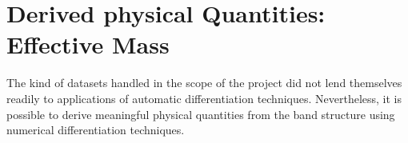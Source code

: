





\section{Derived physical Quantities: Effective Mass}
\label{sec:deriv-phys-quant}



The kind of datasets handled in the scope of the project did not lend themselves
readily to applications of automatic differentiation techniques. Nevertheless,
it is possible to derive meaningful physical quantities from the band structure
using numerical differentiation techniques.

